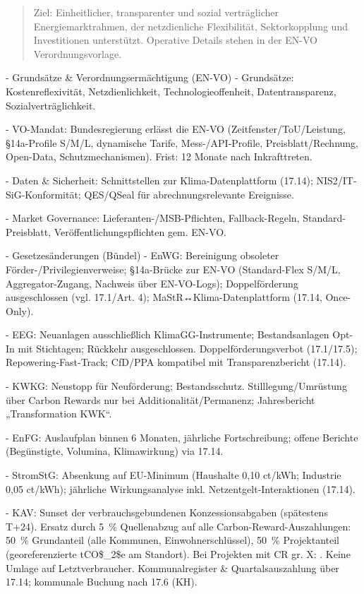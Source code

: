 \documentclass[12pt,a4paper]{scrartcl}
\begin{document}
\begin{quote}
Ziel: Einheitlicher, transparenter und sozial verträglicher Energiemarktrahmen, der netzdienliche Flexibilität, Sektorkopplung und Investitionen unterstützt. Operative Details stehen in der EN-VO Verordnungsvorlage.
\end{quote}

- Grundsätze \& Verordnungsermächtigung (EN-VO)
- Grundsätze: Kostenreflexivität, Netzdienlichkeit, Technologieoffenheit, Datentransparenz, Sozialverträglichkeit.

- VO-Mandat: Bundesregierung erlässt die EN-VO (Zeitfenster/ToU/Leistung, §14a-Profile S/M/L, dynamische Tarife, Mess-/API-Profile, Preisblatt/Rechnung, Open-Data, Schutzmechanismen). Frist: 12 Monate nach Inkrafttreten.

- Daten \& Sicherheit: Schnittstellen zur Klima-Datenplattform (17.14); NIS2/IT-SiG-Konformität; QES/QSeal für abrechnungsrelevante Ereignisse.

- Market Governance: Lieferanten-/MSB-Pflichten, Fallback-Regeln, Standard-Preisblatt, Veröffentlichungspflichten gem. EN-VO.

- Gesetzesänderungen (Bündel)
- EnWG: Bereinigung obsoleter Förder-/Privilegienverweise; §14a-Brücke zur EN-VO (Standard-Flex S/M/L, Aggregator-Zugang, Nachweis über EN-VO-Logs); Doppelförderung ausgeschlossen (vgl. 17.1/Art. 4); MaStR↔Klima-Datenplattform (17.14, Once-Only).

- EEG: Neuanlagen ausschließlich KlimaGG-Instrumente; Bestandsanlagen Opt-In mit Stichtagen; Rückkehr ausgeschlossen. Doppelförderungsverbot (17.1/17.5); Repowering-Fast-Track; CfD/PPA kompatibel mit Transparenzbericht (17.14).

- KWKG: Neustopp für Neuförderung; Bestandsschutz. Stilllegung/Umrüstung über Carbon Rewards nur bei Additionalität/Permanenz; Jahresbericht „Transformation KWK“.

- EnFG: Auslaufplan binnen 6 Monaten, jährliche Fortschreibung; offene Berichte (Begünstigte, Volumina, Klimawirkung) via 17.14.

- StromStG: Absenkung auf EU-Minimum (Haushalte 0,10 ct/kWh; Industrie 0,05 ct/kWh); jährliche Wirkungsanalyse inkl. Netzentgelt-Interaktionen (17.14).

- KAV: Sunset der verbrauchsgebundenen Konzessionsabgaben (spätestens T+24). Ersatz durch 5 \% Quellenabzug auf alle Carbon-Reward-Auszahlungen: 50 \% Grundanteil (alle Kommunen, Einwohnerschlüssel), 50 \% Projektanteil (georeferenzierte tCO\$\_2\$e am Standort). Bei Projekten mit CR gr. X:  . Keine Umlage auf Letztverbraucher. Kommunalregister \& Quartalsauszahlung über 17.14; kommunale Buchung nach 17.6 (KH).
\end{document}
